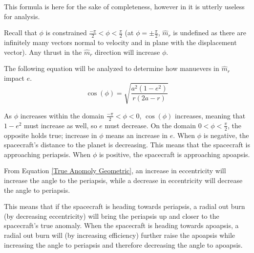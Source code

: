 \documentclass{article}
\begin{document}
This formula is here for the sake of completeness, however in it is utterly useless for analysis.

Recall that $\phi$ is constrained $\frac{-\pi}{2}<\phi<\frac{\pi}{2}$ (at $\phi=\pm\frac{\pi}{2}$, $\hat{m}_r$ is undefined as there are infinitely many vectors normal to velocity and in plane with the displacement vector). Any thrust in the $\hat{m}_r$ direction will increase $\phi$.

The following equation will be analyzed to determine how manuevers in $\hat{m}_r$ impact $e$.
$$\cos(\phi)=\sqrt{\frac{a^2(1-e^2)}{r(2a-r)}}$$

As $\phi$ increases within the domain $\frac{-\pi}{2}<\phi<0$, $\cos(\phi)$ increases, meaning that $1-e^2$ must increase as well, so $e$ must decrease. On the domain $0<\phi<\frac{\pi}{2}$, the opposite holds true; increase in $\phi$ means an increase in $e$. When $\phi$ is negative, the spacecraft's distance to the planet is decreasing. This means that the spacecraft is approaching periapsis. When $\phi$ is positive, the spacecraft is approaching apoapsis.

From Equation \eqref{True Anomoly Geometric}, an increase in eccentricity will increase the angle to the periapsis, while a decrease in eccentricity will decrease the angle to periapsis.

This means that if the spacecraft is heading towards periapsis, a radial out burn (by decreasing eccentricity) will bring the periapsis up and closer to the spacecraft's true anomaly. When the spacecraft is heading towards apoapsis, a radial out burn will (by increasing efficiency) further raise the apoapsis while increasing the angle to periapsis and therefore decreasing the angle to apoapsis.

\end{document}
